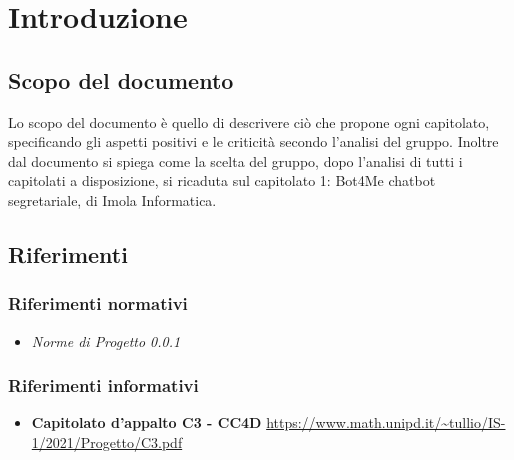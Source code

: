 	\section{Introduzione}
		\subsection {Scopo del documento}
		Lo scopo del documento è quello di descrivere ciò che propone ogni capitolato, specificando gli aspetti positivi e le criticità secondo l'analisi del gruppo. Inoltre dal documento si spiega come la scelta del gruppo, dopo l'analisi di tutti i capitolati a disposizione, si ricaduta sul capitolato 1: Bot4Me chatbot segretariale, di Imola Informatica.
		\subsection {Riferimenti} 
			\subsubsection {Riferimenti normativi} 
			\begin{itemize}
				\item \textit{Norme di Progetto 0.0.1}
			\end{itemize}
			\subsubsection {Riferimenti informativi} 
			\begin{itemize}
				\item \textbf{Capitolato d'appalto C3 - CC4D}\newline
				\url{https://www.math.unipd.it/~tullio/IS-1/2021/Progetto/C3.pdf}
			\end{itemize}